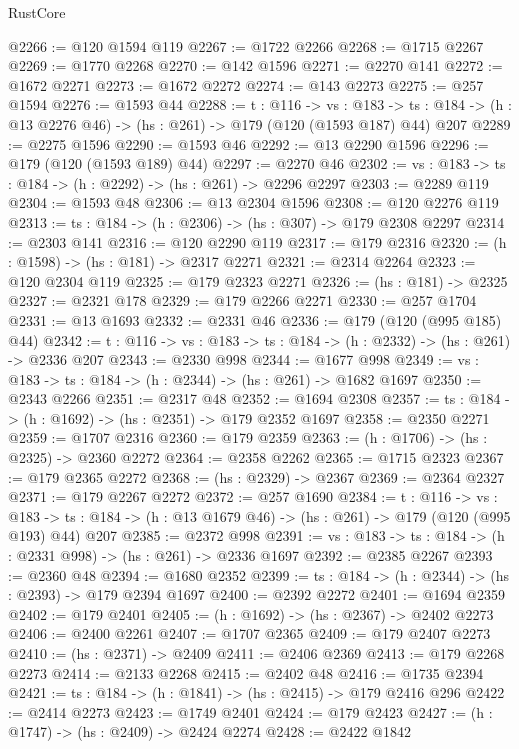 \begin{lexlean}{RustCore}
\begin{coremodule}
@2266 := @120 @1594 @119
@2267 := @1722 @2266
@2268 := @1715 @2267
@2269 := @1770 @2268
@2270 := @142 @1596
@2271 := @2270 @141
@2272 := @1672 @2271
@2273 := @1672 @2272
@2274 := @143 @2273
@2275 := @257 @1594
@2276 := @1593 @44
@2288 := {t : @116} ->
  {vs : @183} ->
  {ts : @184} -> (h : @13 @2276 @46) -> (hs : @261) -> @179 (@120 (@1593 @187) @44) @207
@2289 := @2275 @1596
@2290 := @1593 @46
@2292 := @13 @2290 @1596
@2296 := @179 (@120 (@1593 @189) @44)
@2297 := @2270 @46
@2302 := {vs : @183} -> {ts : @184} -> (h : @2292) -> (hs : @261) -> @2296 @2297
@2303 := @2289 @119
@2304 := @1593 @48
@2306 := @13 @2304 @1596
@2308 := @120 @2276 @119
@2313 := {ts : @184} -> (h : @2306) -> (hs : @307) -> @179 @2308 @2297
@2314 := @2303 @141
@2316 := @120 @2290 @119
@2317 := @179 @2316
@2320 := (h : @1598) -> (hs : @181) -> @2317 @2271
@2321 := @2314 @2264
@2323 := @120 @2304 @119
@2325 := @179 @2323 @2271
@2326 := (hs : @181) -> @2325
@2327 := @2321 @178
@2329 := @179 @2266 @2271
@2330 := @257 @1704
@2331 := @13 @1693
@2332 := @2331 @46
@2336 := @179 (@120 (@995 @185) @44)
@2342 := {t : @116} -> {vs : @183} -> {ts : @184} -> (h : @2332) -> (hs : @261) -> @2336 @207
@2343 := @2330 @998
@2344 := @1677 @998
@2349 := {vs : @183} -> {ts : @184} -> (h : @2344) -> (hs : @261) -> @1682 @1697
@2350 := @2343 @2266
@2351 := @2317 @48
@2352 := @1694 @2308
@2357 := {ts : @184} -> (h : @1692) -> (hs : @2351) -> @179 @2352 @1697
@2358 := @2350 @2271
@2359 := @1707 @2316
@2360 := @179 @2359
@2363 := (h : @1706) -> (hs : @2325) -> @2360 @2272
@2364 := @2358 @2262
@2365 := @1715 @2323
@2367 := @179 @2365 @2272
@2368 := (hs : @2329) -> @2367
@2369 := @2364 @2327
@2371 := @179 @2267 @2272
@2372 := @257 @1690
@2384 := {t : @116} ->
  {vs : @183} ->
  {ts : @184} -> (h : @13 @1679 @46) -> (hs : @261) -> @179 (@120 (@995 @193) @44) @207
@2385 := @2372 @998
@2391 := {vs : @183} -> {ts : @184} -> (h : @2331 @998) -> (hs : @261) -> @2336 @1697
@2392 := @2385 @2267
@2393 := @2360 @48
@2394 := @1680 @2352
@2399 := {ts : @184} -> (h : @2344) -> (hs : @2393) -> @179 @2394 @1697
@2400 := @2392 @2272
@2401 := @1694 @2359
@2402 := @179 @2401
@2405 := (h : @1692) -> (hs : @2367) -> @2402 @2273
@2406 := @2400 @2261
@2407 := @1707 @2365
@2409 := @179 @2407 @2273
@2410 := (hs : @2371) -> @2409
@2411 := @2406 @2369
@2413 := @179 @2268 @2273
@2414 := @2133 @2268
@2415 := @2402 @48
@2416 := @1735 @2394
@2421 := {ts : @184} -> (h : @1841) -> (hs : @2415) -> @179 @2416 @296
@2422 := @2414 @2273
@2423 := @1749 @2401
@2424 := @179 @2423
@2427 := (h : @1747) -> (hs : @2409) -> @2424 @2274
@2428 := @2422 @1842

\end{coremodule}
\end{lexlean}

